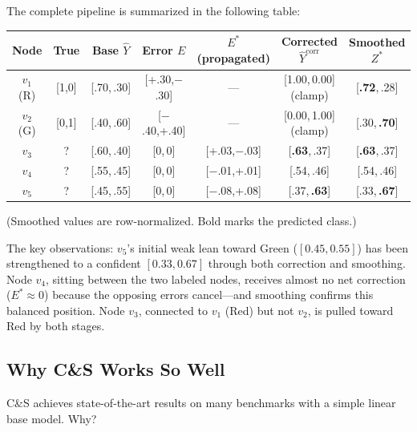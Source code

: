 \begin{notechapter}
The complete pipeline is summarized in the following table:

\begin{center}
\small
\begin{tabular}{c|c|c|c|c|c|c}
\toprule
Node & True & Base $\hat{Y}$ & Error $E$ & $E^*$ (propagated)
  & Corrected $\hat{Y}^{\text{corr}}$ & Smoothed $Z^*$ \\
\midrule
$v_1$ (R) & [1,0] & [.70,\,.30] & [+.30,$-$.30] & ---
  & [1.00,\,0.00] (clamp) & [\textbf{.72},\,.28] \\
$v_2$ (G) & [0,1] & [.40,\,.60] & [$-$.40,+.40] & ---
  & [0.00,\,1.00] (clamp) & [.30,\,\textbf{.70}] \\
$v_3$ & ? & [.60,\,.40] & [0,\,0] & [+.03,$-$.03]
  & [\textbf{.63},\,.37] & [\textbf{.63},\,.37] \\
$v_4$ & ? & [.55,\,.45] & [0,\,0] & [$-$.01,+.01]
  & [.54,\,.46] & [.54,\,.46] \\
$v_5$ & ? & [.45,\,.55] & [0,\,0] & [$-$.08,+.08]
  & [.37,\,\textbf{.63}] & [.33,\,\textbf{.67}] \\
\bottomrule
\end{tabular}
\end{center}
(Smoothed values are row-normalized. Bold marks the predicted class.)

The key observations: $v_5$'s initial weak lean toward Green ($[0.45, 0.55]$)
has been strengthened to a confident $[0.33, 0.67]$ through both correction and
smoothing. Node $v_4$, sitting between the two labeled nodes, receives almost
no net correction ($E^* \approx 0$) because the opposing errors cancel---and
smoothing confirms this balanced position. Node $v_3$, connected to $v_1$ (Red)
but not $v_2$, is pulled toward Red by both stages.

\subsection{Why C\&S Works So Well}

C\&S achieves state-of-the-art results on many benchmarks with a simple linear
base model. Why?


\end{notechapter}
